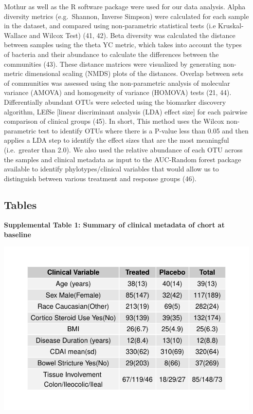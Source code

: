 \documentclass[11pt,]{article}
\begin{document}
Mothur as well as the R software package were used for our data
analysis. Alpha diversity metrics (e.g.~Shannon, Inverse Simpson) were
calculated for each sample in the dataset, and compared using
non-parametric statistical tests (i.e Kruskal-Wallace and Wilcox Test)
(41, 42). Beta diversity was calculated the distance between samples
using the theta YC metric, which takes into account the types of
bacteria and their abundance to calculate the differences between the
communities (43). These distance matrices were visualized by generating
non-metric dimensional scaling (NMDS) plots of the distances. Overlap
between sets of communities was assessed using the non-parametric
analysis of molecular variance (AMOVA) and homogeneity of variance
(HOMOVA) tests (21, 44). Differentially abundant OTUs were selected
using the biomarker discovery algorithm, LEfSe {[}linear discriminant
analysis (LDA) effect size{]} for each pairwise comparison of clinical
groups (45). In short, This method uses the Wilcox non-parametric test
to identify OTUs where there is a P-value less than 0.05 and then
applies a LDA step to identify the effect sizes that are the most
meaningful (i.e.~greater than 2.0). We also used the relative abundance
of each OTU across the samples and clinical metadata as input to the
AUC-Random forest package available to identify phylotypes/clinical
variables that would allow us to distinguish between various treatment
and response groups (46).

\newpage

\subsection{Tables}\label{tables}

\textbf{Supplemental Table 1: Summary of clinical metadata of chort at
baseline}

\includegraphics{tables/SupTable1_baseline_metadata.pdf}
\end{document}
